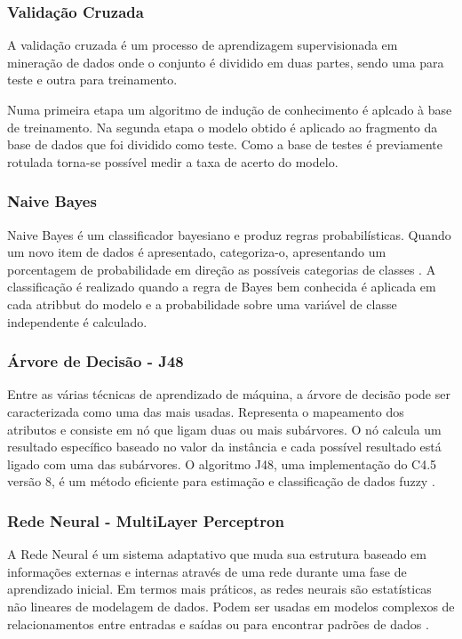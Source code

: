 \documentclass[12pt]{article}
\begin{document}
\subsubsection{Validação Cruzada} \label{sec:cv10}

    A validação cruzada é um processo de aprendizagem supervisionada em mineração de dados onde o conjunto é dividido em duas partes, sendo uma para teste e outra para treinamento.
    
    Numa primeira etapa um algoritmo de indução de conhecimento é aplcado à base de treinamento. Na segunda etapa o modelo obtido é aplicado ao fragmento da base de dados que foi dividido como teste. Como a base de testes é previamente rotulada torna-se possível medir  a taxa de acerto do modelo.
    

\subsubsection{Naive Bayes} \label{sec:nb}

    Naive Bayes é um classificador bayesiano e produz regras probabilísticas. Quando um novo item de dados é apresentado, categoriza-o, apresentando um porcentagem de probabilidade em direção as possíveis categorias de classes \cite{cancer}. A classificação é realizado quando a regra de Bayes bem conhecida é aplicada em cada atribbut do modelo e a probabilidade sobre uma variável de classe independente é calculado.

\subsubsection{Árvore de Decisão - J48} \label{sec:j48}

    Entre as várias técnicas de aprendizado de máquina, a árvore de decisão pode ser caracterizada como  uma das mais usadas. Representa o mapeamento dos atributos e consiste em nó que ligam duas ou mais subárvores. O nó calcula um resultado específico baseado no valor da instância e cada possível resultado está ligado com uma das subárvores. O algoritmo J48, uma implementação do C4.5 versão 8, é um método eficiente para estimação e classificação de dados fuzzy \cite{cancer}.
    
\subsubsection{Rede Neural - MultiLayer Perceptron} \label{sec:mlp}

    A Rede Neural é um sistema adaptativo que muda sua estrutura baseado em informações externas e internas através de uma rede durante uma fase de aprendizado inicial. Em termos mais práticos, as redes neurais são estatísticas não lineares de modelagem de dados. Podem ser usadas em modelos complexos de relacionamentos entre entradas e saídas ou para encontrar padrões de dados \cite{cancer}.
\end{document}
